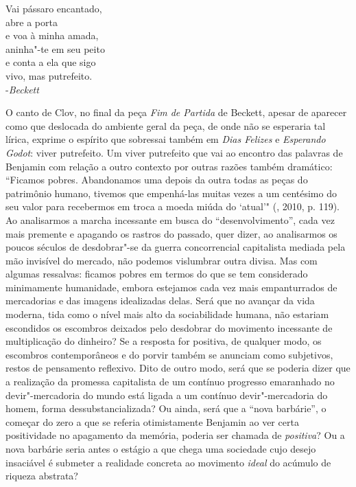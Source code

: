 \begin{flushright}
\scriptsize{Vai pássaro encantado,\\
abre a porta\\
e voa à minha amada,\\
aninha"-te em seu peito\\
e conta a ela que sigo\\
vivo, mas putrefeito.\\
-\emph{Beckett}}
\end{flushright}

O canto de Clov, no final da peça \emph{Fim de Partida} de Beckett,
apesar de aparecer como que deslocada do ambiente geral da
peça, de onde não se esperaria tal lírica, exprime o espírito que
sobressai também em \emph{Dias Felizes} e \emph{Esperando Godot}:
viver putrefeito. Um viver putrefeito que vai ao encontro das
palavras de Benjamin com relação a outro contexto por outras razões
também dramático: ``Ficamos pobres. Abandonamos uma depois da outra
todas as peças do patrimônio humano, tivemos que empenhá-las muitas
vezes a um centésimo do seu valor para recebermos em troca a moeda miúda
do `atual'" (, 2010, p. 119). Ao analisarmos a marcha
incessante em busca do ``desenvolvimento'', cada vez mais premente e
apagando os rastros do passado, quer dizer, ao analisarmos os poucos
séculos de desdobrar"-se da guerra concorrencial capitalista mediada pela
mão invisível do mercado, não podemos vislumbrar outra divisa. Mas com
algumas ressalvas: ficamos pobres em termos do que se tem considerado
minimamente humanidade, embora estejamos cada vez mais empanturrados de
mercadorias e das imagens idealizadas delas. Será que no avançar da vida
moderna, tida como o nível mais alto da sociabilidade humana, não
estariam escondidos os escombros deixados pelo desdobrar do movimento
incessante de multiplicação do dinheiro? Se a resposta for positiva, de
qualquer modo, os escombros contemporâneos e do porvir também se
anunciam como subjetivos, restos de pensamento reflexivo. Dito de outro
modo, será que se poderia dizer que a realização da promessa capitalista
de um contínuo progresso emaranhado no devir"-mercadoria do mundo está
ligada a um contínuo devir"-mercadoria do homem, forma
dessubstancializada? Ou ainda, será que a ``nova barbárie'', o começar
do zero a que se referia otimistamente Benjamin ao ver
certa positividade no apagamento da memória, poderia ser chamada de
\emph{positiva}? Ou a nova barbárie seria antes o estágio a que chega
uma sociedade cujo desejo insaciável é submeter a realidade concreta ao
movimento \emph{ideal} do acúmulo de riqueza abstrata?

